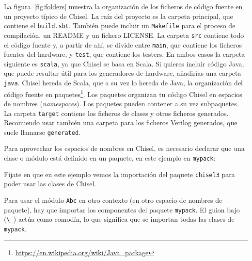 \documentclass[%
    10pt,
    headinclude, footinclude=false,
    openright, %
    notitlepage,
    cleardoublepage=empty,
    headsepline,
    numbers=noenddot,
    bibliography=totoc, index=totoc,
    ]{scrbook}
\newcommand{\code}[1]{{\lstinline[basicstyle=\small\ttfamily]{#1}}}
\newcommand{\myref}[2]{\href{#1}{#2}}
\renewcommand{\myref}[2]{{#2}{\footnote{\url{#1}}}}
\begin{document}
La figura~\ref{fig:folders} muestra la organización de los ficheros de código fuente en un proyecto típico de Chisel.
La raíz del proyecto es la carpeta principal, que contiene el \code{build.sbt}.
También puede incluir un \code{Makefile} para el proceso de compilación, un README y un fichero LICENSE.
La carpeta \code{src} contiene todo el código fuente y, a partir de ahí, se divide entre \code{main},
que contiene los ficheros fuentes del hardware, y \code{test}, que contiene los testers.
En ambos casos la carpeta siguiente es \code{scala}, ya que Chisel se basa en Scala.
Si quieres incluir código Java, que puede resultar útil para los generadores de hardware,
añadirías una carpeta \code{java}.
Chisel hereda de Scala, que a su vez lo hereda de Java, la organización del código fuente en
\myref{https://en.wikipedia.org/wiki/Java_package}{paquetes}.
Los paquetes organizan tu código Chisel en espacios de nombres (\emph{namespaces}). Los paquetes pueden contener
a su vez subpaquetes.
La carpeta \code{target} contiene los ficheros de clases y otros ficheros generados.
Recomiendo usar también una carpeta para los ficheros Verilog generados, que suele
llamarse \code{generated}.


Para aprovechar los espacios de nombres en Chisel, es necesario declarar que una clase o módulo
está definido en un paquete, en este ejemplo en \code{mypack}:



\noindent Fíjate en que en este ejemplo vemos la importación del paquete \code{chisel3}
para poder usar las clases de Chisel.


Para usar el módulo \code{Abc} en otro contexto (en otro espacio de nombres de paquete),
hay que importar los componentes del paquete \code{mypack}. El guion bajo
(\code{\_}) actúa como comodín, lo que significa que se importan todas las clases de \code{mypack}.

\end{document}
